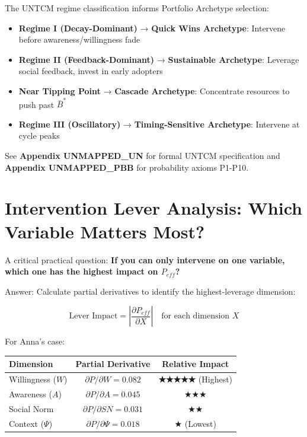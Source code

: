 \begin{tcolorbox}[colback=orange!5!white, colframe=orange!75!black, title=UNTCM Connection to Portfolio Archetypes (Chapter 20)]
The UNTCM regime classification informs Portfolio Archetype selection:
\begin{itemize}[nosep]
\item \textbf{Regime I (Decay-Dominant)} → \textbf{Quick Wins Archetype}: Intervene before awareness/willingness fade
\item \textbf{Regime II (Feedback-Dominant)} → \textbf{Sustainable Archetype}: Leverage social feedback, invest in early adopters
\item \textbf{Near Tipping Point} → \textbf{Cascade Archetype}: Concentrate resources to push past $\bar{B}^*$
\item \textbf{Regime III (Oscillatory)} → \textbf{Timing-Sensitive Archetype}: Intervene at cycle peaks
\end{itemize}
See \textbf{Appendix UNMAPPED_UN} for formal UNTCM specification and \textbf{Appendix UNMAPPED_PBB} for probability axioms P1-P10.
\end{tcolorbox}

\section{Intervention Lever Analysis: Which Variable Matters Most?}\label{sec:ch16-levers}

A critical practical question: \textbf{If you can only intervene on one variable, which one has the highest impact on $P_{eff}$?}

Answer: Calculate partial derivatives to identify the highest-leverage dimension:

\begin{equation}
\text{Lever Impact} = \left| \frac{\partial P_{eff}}{\partial X} \right| \quad \text{for each dimension } X
\end{equation}

For Anna's case:

\begin{center}
\begin{tabular}{|l|c|c|}
\hline
\textbf{Dimension} & \textbf{Partial Derivative} & \textbf{Relative Impact} \\
\hline
Willingness ($W$) & $\partial P / \partial W = 0.082$ & \textbf{★★★★★} (Highest) \\
\hline
Awareness ($A$) & $\partial P / \partial A = 0.045$ & ★★★ \\
\hline
Social Norm & $\partial P / \partial SN = 0.031$ & ★★ \\
\hline
Context ($\Psi$) & $\partial P / \partial \Psi = 0.018$ & ★ (Lowest) \\
\hline
\end{tabular}
\end{center}

